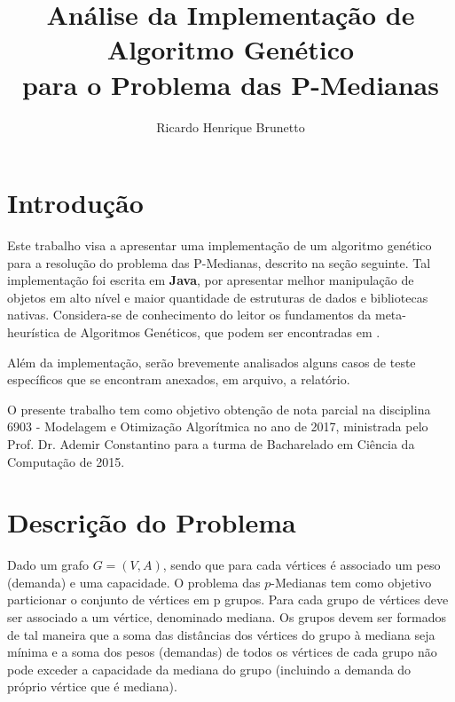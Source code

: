 

\sloppy

\title{Análise da Implementação de Algoritmo Genético\\para o Problema das P-Medianas}

\author{Ricardo Henrique Brunetto}


\address{Departamento de Informática -- Universidade Estadual de Maringá (UEM)\\
	Maringá -- PR -- Brasil
}



	\maketitle

  \section{Introdução}
	Este trabalho visa a apresentar uma implementação de um algoritmo genético para a resolução do problema das P-Medianas, descrito na seção seguinte. Tal implementação foi escrita em \textbf{Java}, por apresentar melhor manipulação de objetos em alto nível e maior quantidade de estruturas de dados e bibliotecas nativas. Considera-se de conhecimento do leitor os fundamentos da meta-heurística de Algoritmos Genéticos, que podem ser encontradas em \cite{alggen}.

	Além da implementação, serão brevemente analisados alguns casos de teste específicos que se encontram anexados, em arquivo, a relatório.

	O presente trabalho tem como objetivo obtenção de nota parcial na disciplina 6903 - Modelagem e Otimização Algorítmica no ano de 2017, ministrada pelo Prof. Dr. Ademir Constantino para a turma de Bacharelado em Ciência da Computação de 2015.

  \section{Descrição do Problema}

	Dado um grafo $G=(V, A)$, sendo que para cada vértices é associado um peso (demanda) e uma capacidade. O problema das $p$-Medianas tem como objetivo particionar o conjunto de vértices em p grupos. Para cada grupo de vértices deve ser associado a um vértice, denominado mediana. Os grupos devem ser formados de tal maneira que a soma das distâncias dos vértices do grupo à mediana seja mínima e a soma dos pesos (demandas) de todos os vértices de cada grupo não pode exceder a capacidade da mediana do grupo (incluindo a demanda do próprio vértice que é mediana).

